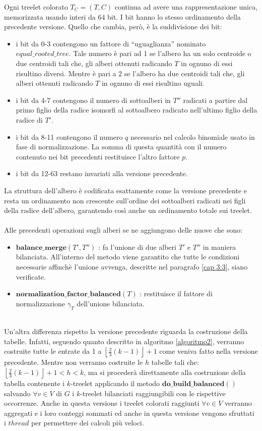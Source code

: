 Ogni treelet colorato $ T_C = (T,C)$ continua ad avere una rappresentazione unica, memorizzata usando interi da 64 bit.
I bit hanno lo stesso ordinamento della precedente versione.
Quello che cambia, per\`o, \`e la suddivisione dei bit:
\begin{itemize}
	\item i bit da 0-3 contengono un fattore di ``uguaglianza'' nominato $ \textit{equal\_rooted\_tree} $.
	Tale numero \`e pari ad 1 se l'albero ha un solo centroide o due centroidi tali che, gli alberi ottenuti radicando $ T $ in ognuno di essi risultino diversi.
	Mentre \`e pari a  2 se l'albero ha due centroidi tali che, gli alberi ottenuti radicando $ T $ in ognuno di essi risultino uguali.
	\item  i bit da 4-7 contengono il numero di sottoalberi in $ T'' $ radicati a partire dal primo figlio della radice isomorfi al sottoalbero radicato nell'ultimo figlio della radice di $ T' $.
	\item i bit da 8-11 contengono il numero $ q $ necessario nel calcolo binomiale usato in fase di normalizzazione.
	La somma di questa quantit\`a con il numero contenuto nei bit precedenti restituisce l'altro fattore $ p $.
	\item i bit da 12-63 restano invariati alla versione precedente.	  
\end{itemize} 

La struttura dell'albero \`e codificata esattamente come la versione precedente e resta un ordinamento non crescente sull'ordine dei sottoalberi radicati nei figli della radice dell'albero, garantendo cos\`i anche un ordinamento totale sui treelet.\\\\
Alle precedenti operazioni sugli alberi se ne aggiungono delle nuove che sono:
\begin{itemize}
	\item $ \textbf{balance\_merge}(T',T'') $ : fa l'unione di due alberi $ T' $ e $ T'' $ in maniera bilanciata.
	All'interno del metodo viene garantito che tutte le condizioni necessarie affinch\`e l'unione avvenga, descritte nel paragrafo \ref{cap 3:3}, siano verificate.
	\item $ \textbf{normalization\_factor\_balanced}(T) $ : restituisce il fattore di normalizzazione $ \gamma_T $ dell'unione bilanciata.
\end{itemize}\mbox{}\\
Un'altra differenza rispetto la versione precedente riguarda la costruzione della tabelle.
Infatti, seguendo quanto descritto in algoritmo \ref{algoritmo2}, verranno costruite tutte le entrate da 1 a  $ \left\lfloor \frac{2}{3}(k-1) \right\rfloor +1 $ come veniva fatto nella versione precedente.
Mentre non verranno costruite le $ h $ tabelle tali che: $ \left\lfloor \frac{2}{3}(k-1) \right\rfloor +1 < h < k $, ma si proceder\`a direttamente alla costruzione della tabella contenente i $ k $-treelet applicando il metodo $ \textbf{do\_build\_balanced}() $ salvando $ \forall v \in V $ di $ G $ i $ k $-treelet bilanciati raggiungibili con le rispettive occorrenze.
Anche in questa versione i treelet colorati raggiunti $ \forall v \in V $ verranno aggregati e i loro conteggi sommati ed anche in questa versione vengono sfruttati i $ thread $ per permettere dei calcoli pi\`u veloci.